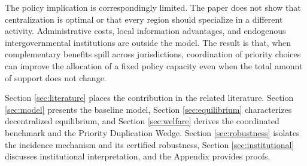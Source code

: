 The policy implication is correspondingly limited. The paper does not show that centralization is optimal or that every region should specialize in a different activity. Administrative costs, local information advantages, and endogenous intergovernmental institutions are outside the model. The result is that, when complementary benefits spill across jurisdictions, coordination of priority choices can improve the allocation of a fixed policy capacity even when the total amount of support does not change.

Section \ref{sec:literature} places the contribution in the related literature. Section \ref{sec:model} presents the baseline model, Section \ref{sec:equilibrium} characterizes decentralized equilibrium, and Section \ref{sec:welfare} derives the coordinated benchmark and the Priority Duplication Wedge. Section \ref{sec:robustness} isolates the incidence mechanism and its certified robustness, Section \ref{sec:institutional} discusses institutional interpretation, and the Appendix provides proofs.

